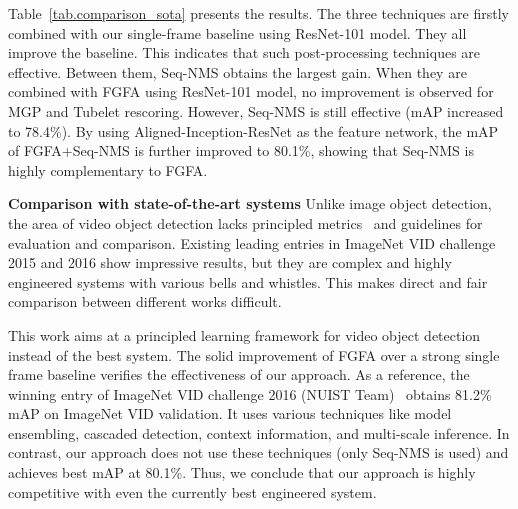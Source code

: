 \documentclass[10pt,twocolumn,letterpaper]{article}
\begin{document}
Table~\ref{tab.comparison_sota} presents the results. The three techniques are firstly combined with our single-frame baseline using ResNet-101 model. They all improve the baseline. This indicates that such post-processing techniques are effective. Between them, Seq-NMS obtains the largest gain. When they are combined with FGFA using ResNet-101 model, no improvement is observed for MGP and Tubelet rescoring. However, Seq-NMS is still effective (mAP increased to 78.4\%). By using  Aligned-Inception-ResNet as the feature network, the mAP of FGFA+Seq-NMS is further improved to 80.1\%, showing that Seq-NMS is highly complementary to FGFA.

\textbf{Comparison with state-of-the-art systems} Unlike image object detection, the area of video object detection lacks principled metrics~\cite{zhang2016stability} and guidelines for evaluation and comparison. Existing leading entries in ImageNet VID challenge 2015 and 2016 show impressive results, but they are complex and highly engineered systems with various bells and whistles. This makes direct and fair comparison between different works difficult.

This work aims at a principled learning framework for video object detection instead of the best system. The solid improvement of FGFA over a strong single frame baseline verifies the effectiveness of our approach. As a reference, the winning entry of ImageNet VID challenge 2016 (NUIST Team)~\cite{deng2016nuist} obtains 81.2\% mAP on ImageNet VID validation. It uses various techniques like model ensembling, cascaded detection, context information, and multi-scale inference. In contrast, our approach does not use these techniques (only Seq-NMS is used) and achieves best mAP at 80.1\%. Thus, we conclude that our approach is highly competitive with even the currently best engineered system.
\end{document}
